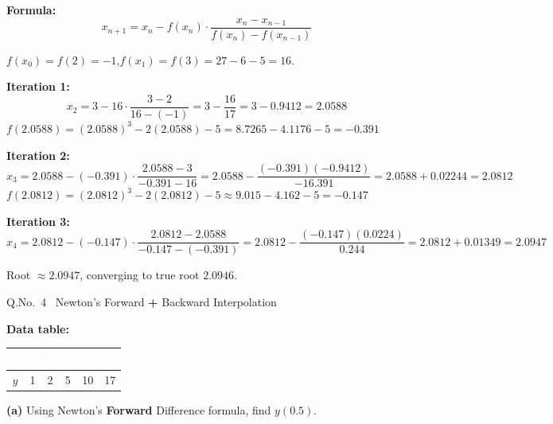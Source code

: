 \documentclass[12pt]{article}
\begin{document}
\begin{ansbox}
\textbf{Formula:}
\[
  x_{n+1} = x_n - f(x_n)\cdot\frac{x_n - x_{n-1}}{f(x_n) - f(x_{n-1})}
\]

$f(x_0) = f(2) = -1$,\quad $f(x_1) = f(3) = 27-6-5 = 16$.

\medskip\textbf{Iteration 1:}
\[
  x_2 = 3 - 16\cdot\frac{3-2}{16-(-1)} = 3 - \frac{16}{17} = 3 - 0.9412 = 2.0588
\]
$f(2.0588) = (2.0588)^3 - 2(2.0588) - 5 = 8.7265 - 4.1176 - 5 = -0.391$

\medskip\textbf{Iteration 2:}
\[
  x_3 = 2.0588 - (-0.391)\cdot\frac{2.0588-3}{-0.391-16} = 2.0588 - \frac{(-0.391)(-0.9412)}{-16.391} = 2.0588 + 0.02244 = 2.0812
\]
$f(2.0812) = (2.0812)^3 - 2(2.0812) - 5 \approx 9.015 - 4.162 - 5 = -0.147$

\medskip\textbf{Iteration 3:}
\[
  x_4 = 2.0812 - (-0.147)\cdot\frac{2.0812-2.0588}{-0.147-(-0.391)} = 2.0812 - \frac{(-0.147)(0.0224)}{0.244} = 2.0812 + 0.01349 = 2.0947
\]

Root $\approx \mathbf{2.0947}$, converging to true root $2.0946$.\;\checkmark
\end{ansbox}

\newpage

\begin{qbox}{Q.No.\ 4 \textemdash\ Newton's Forward \textbf{+} Backward Interpolation}
\end{qbox}

\medskip
\textbf{Data table:}
\begin{center}
\begin{tabular}{|c|c|c|c|c|c|}
\hline
\rowcolor{primary!80}
\textcolor{white}{\textbf{$x$}} & \textcolor{white}{\textbf{0}} & \textcolor{white}{\textbf{1}} & \textcolor{white}{\textbf{2}} & \textcolor{white}{\textbf{3}} & \textcolor{white}{\textbf{4}}\\
\hline
$y$ & 1 & 2 & 5 & 10 & 17\\\hline
\end{tabular}
\end{center}

\textbf{(a)} Using Newton's \textbf{Forward} Difference formula, find $y(0.5)$.
\end{document}
